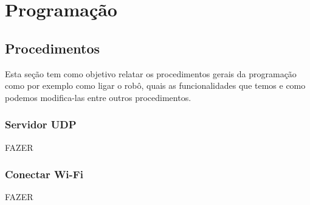 \chapter{Programação}

	\section{Procedimentos}
		Esta seção tem como objetivo relatar os procedimentos gerais da programação como por exemplo como ligar o robô, quais as funcionalidades que temos e como podemos modifica-las entre outros procedimentos.
		
		\subsection{Servidor UDP}
			FAZER
			
		\subsection{Conectar Wi-Fi}
			FAZER
